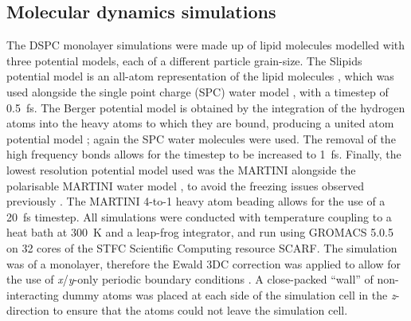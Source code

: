 \documentclass[amsmath,amssymb,twocolumn,superscriptaddress]{revtex4-1}
\begin{document}
\subsection{Molecular dynamics simulations}
The DSPC monolayer simulations were made up of lipid molecules modelled with
three potential models, each of a different particle grain-size.
The Slipids potential model is an all-atom representation of the lipid
molecules \cite{jambeck_derivation_2012}, which was used alongside the single
point charge (SPC) water model \cite{berendsen_missing_1987}, with a timestep
of \SI{0.5}{\femto\second}.
The Berger potential model is obtained by the integration of the hydrogen
atoms into the heavy atoms to which they are bound, producing a united atom
potential model \cite{berger_molecular_1997};
again the SPC water molecules were used.
The removal of the high frequency  bonds allows for the timestep to
be increased to \SI{1}{\femto\second}.
Finally, the lowest resolution potential model used was the
MARTINI \cite{marrink_martini_2007} alongside the polarisable MARTINI water
model \cite{yesylevskyy_polarizable_2010}, to avoid the freezing issues
observed previously \cite{koutsioubas_combined_2016}.
The MARTINI 4-to-1 heavy atom beading allows for the use of
a \SI{20}{\femto\second} timestep.
All simulations were conducted with temperature coupling to a heat bath
at \SI{300}{\kelvin} and a leap-frog integrator, and run using GROMACS
5.0.5 \cite{berendsen_gromacs_1995,lindahl_gromacs_2001,
van_der_spoel_gromacs_2005,hess_gromacs_2008} on 32 cores of the STFC
Scientific Computing resource SCARF.
The simulation was of a monolayer, therefore the Ewald 3DC correction was
applied to allow for the use of \emph{x}/\emph{y}-only periodic boundary
conditions \cite{yeh_ewald_1999}.
A close-packed ``wall'' of non-interacting dummy atoms was placed at each
side of the simulation cell in the \emph{z}-direction to ensure that the
atoms could not leave the simulation cell.
\end{document}
